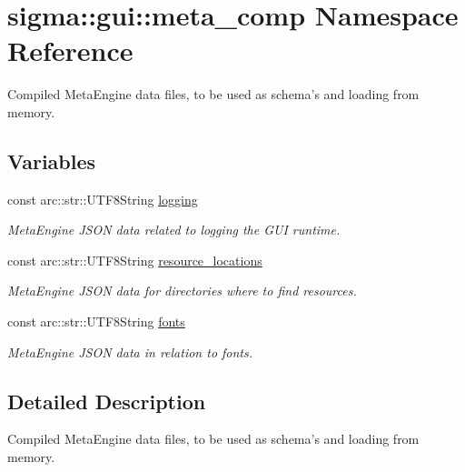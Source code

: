 \hypertarget{namespacesigma_1_1gui_1_1meta__comp}{\section{sigma\-:\-:gui\-:\-:meta\-\_\-comp Namespace Reference}
\label{namespacesigma_1_1gui_1_1meta__comp}
}


Compiled Meta\-Engine data files, to be used as schema's and loading from memory.  


\subsection*{Variables}
\begin{DoxyCompactItemize}
\item 
\hypertarget{namespacesigma_1_1gui_1_1meta__comp_a9d830b72a14e4195dec0dacf0808fd94}{const arc\-::str\-::\-U\-T\-F8\-String \hyperlink{namespacesigma_1_1gui_1_1meta__comp_a9d830b72a14e4195dec0dacf0808fd94}{logging}}\label{namespacesigma_1_1gui_1_1meta__comp_a9d830b72a14e4195dec0dacf0808fd94}

\begin{DoxyCompactList}\small\item\em Meta\-Engine J\-S\-O\-N data related to logging the G\-U\-I runtime. \end{DoxyCompactList}\item 
\hypertarget{namespacesigma_1_1gui_1_1meta__comp_a8c33d88d36657b5ada3966bbb157ff3d}{const arc\-::str\-::\-U\-T\-F8\-String \hyperlink{namespacesigma_1_1gui_1_1meta__comp_a8c33d88d36657b5ada3966bbb157ff3d}{resource\-\_\-locations}}\label{namespacesigma_1_1gui_1_1meta__comp_a8c33d88d36657b5ada3966bbb157ff3d}

\begin{DoxyCompactList}\small\item\em Meta\-Engine J\-S\-O\-N data for directories where to find resources. \end{DoxyCompactList}\item 
\hypertarget{namespacesigma_1_1gui_1_1meta__comp_a5d2a7fc67952b94831e43c67d8072a2e}{const arc\-::str\-::\-U\-T\-F8\-String \hyperlink{namespacesigma_1_1gui_1_1meta__comp_a5d2a7fc67952b94831e43c67d8072a2e}{fonts}}\label{namespacesigma_1_1gui_1_1meta__comp_a5d2a7fc67952b94831e43c67d8072a2e}

\begin{DoxyCompactList}\small\item\em Meta\-Engine J\-S\-O\-N data in relation to fonts. \end{DoxyCompactList}\end{DoxyCompactItemize}


\subsection{Detailed Description}
Compiled Meta\-Engine data files, to be used as schema's and loading from memory. 